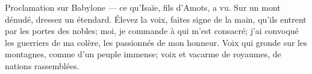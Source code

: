 Proclamation sur Babylone --- ce qu’Isaïe, fils d’Amots, a vu.
Sur un mont dénudé, dressez un étendard.
Élevez la voix, faites signe de la main,
	qu’ils entrent par les portes des nobles;
	moi, je commande à qui m’est consacré;
	j’ai convoqué les guerriers de ma colère, les passionnés de mon honneur.
Voix qui gronde sur les montagnes, comme d’un peuple immense;
	voix et vacarme de royaumes, de nations rassemblées.
